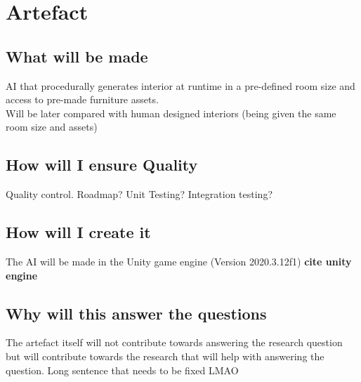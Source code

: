 \section{Artefact}

\subsection{What will be made}
AI that procedurally generates interior at runtime in a pre-defined room size and access to pre-made furniture assets.
\\
Will be later compared with human designed interiors (being given the same room size and assets)

\subsection{How will I ensure Quality}
Quality control. Roadmap? Unit Testing? Integration testing?

\subsection{How will I create it}
The AI will be made in the Unity game engine (Version 2020.3.12f1) \textbf{cite unity engine}

\subsection{Why will this answer the questions}
The artefact itself will not contribute towards answering the research question but will contribute towards the research that will help with answering the question. Long sentence that needs to be fixed LMAO